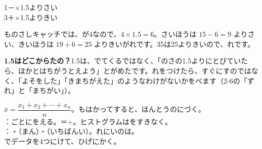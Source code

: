 \begin{center}
1－×1.5\enspace よりさい\\
3＋×1.5\enspace よりきい
\end{center}

ものさしキャッチでは、が4なので、$4\times1.5=6$。さいほうは $15-6=9$ よりさい、きいほうは $19+6=25$ よりきいがれです。35は25よりきいので、れです。

\noindent\textbf{1.5はどこからたの？}\quad 1.5は、でてくるではなく、「のさの1.5よりにとびていたら、ほかとはちがうとえよう」とがめたです。れをつけたら、すぐにすのではなく、「よそをした」「きまちがえた」のようなわけがないかをべます（2-6の「ずれ」と「まちがい」）。

\begin{taisetsu}
 $\bar{x}=\dfrac{x_1+x_2+\cdots+x_n}{n}$。もはかってすると、ほんとうのにづく。\\
：ごとにをえる。＝÷。ヒストグラムはをすきなく。\\
：・（まん）・（いちばんい）。れにいのは。\\
でデータを4つにけて、ひげにかく。
\end{taisetsu}


